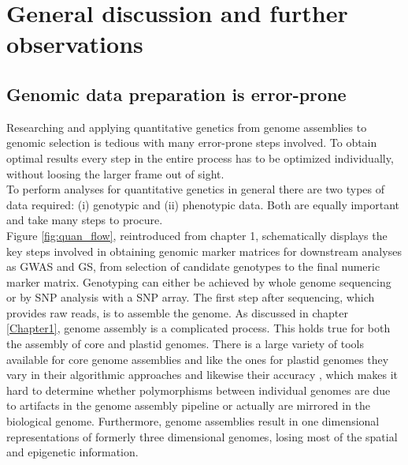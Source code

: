 \chapter{General discussion and further observations} %
\label{Chapter6}
\section{Genomic data preparation is error-prone}

Researching and applying quantitative genetics from genome assemblies to genomic selection
is tedious with many error-prone steps involved. To obtain optimal results every step in
the entire process has to be optimized individually, without loosing the larger frame out
of sight. \\
To perform analyses for quantitative genetics in general there are two types of data
required: (i) genotypic and (ii) phenotypic data. Both are equally important and take many
steps to procure. \\
Figure \ref{fig:quan_flow}, reintroduced from chapter 1, schematically displays the key
steps involved in obtaining genomic marker matrices for downstream analyses as GWAS and GS,
from selection of candidate genotypes to the final numeric marker matrix. Genotyping can
either be achieved by whole genome sequencing or by SNP analysis with a SNP array. The
first step after sequencing, which provides raw reads, is to assemble the genome. As
discussed in chapter \ref{Chapter1}, genome assembly is a complicated process. This holds
true for both the assembly of core and plastid genomes. There is a large variety of tools
available for core genome assemblies and like the ones for plastid genomes they vary in
their algorithmic approaches and likewise their accuracy \cite{zhang2011practical}, which
makes it hard to determine whether polymorphisms between individual genomes are due to
artifacts in the genome assembly pipeline or actually are mirrored in the biological
genome. Furthermore, genome assemblies result in one dimensional representations of
formerly three dimensional genomes, losing most of the spatial and epigenetic information.

